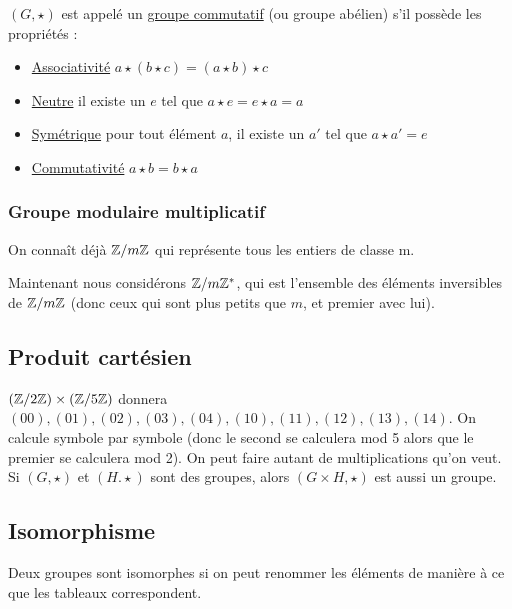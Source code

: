 \documentclass[11pt,a4paper]{article}
\renewcommand{\)}{\right)}
\renewcommand{\(}{\left(}
\begin{document}
$(G,\star)$ est appelé un \uline{groupe commutatif} (ou groupe abélien) s'il possède les propriétés :

\begin{itemize}
	\item 	\uline{Associativité} 	$a\star (b\star c) = (a\star b)\star c$
	\item 	\uline{Neutre} il existe un $e$ tel que $a\star e = e\star a = a$
	\item 	\uline{Symétrique} pour tout élément $a$, il existe un $a'$ tel que $a \star a' = e$
	\item 	\uline{Commutativité} $a\star b = b\star a$
\end{itemize}

\subsubsection{Groupe modulaire multiplicatif}
On connaît déjà $\mathbb{Z}/m\mathbb{Z}$ qui représente tous les entiers de classe m. 

Maintenant nous considérons \uline{$\mathbb{Z}/m\mathbb{Z}^*$}, qui est l'ensemble des éléments inversibles de $\mathbb{Z}/m\mathbb{Z}$ (donc ceux qui sont plus petits que $m$, et premier avec lui).

\subsection{Produit cartésien}
$(\mathbb{Z}/2\mathbb{Z}) \times (\mathbb{Z}/5\mathbb{Z})$ donnera $(00), (01), (02), (03) ,(04), (10), (11), (12), (13), (14)$. On calcule symbole par symbole (donc le second se calculera mod 5 alors que le premier se calculera mod 2). On peut faire autant de multiplications qu'on veut. Si $(G,\star)$ et $(H.\star)$ sont des groupes, alors $(G\times H,\star)$ est aussi un groupe.

\subsection{Isomorphisme}
Deux groupes sont isomorphes si on peut renommer les éléments de manière à ce que les tableaux correspondent.
\end{document}
